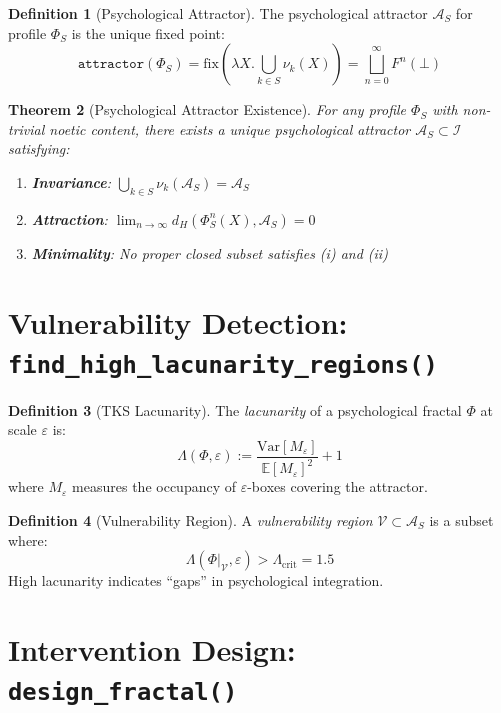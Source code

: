 \documentclass[11pt,twoside]{book}
\newcommand{\noe}[1]{\nu_{#1}}
\newcommand{\Ideas}{\mathcal{I}}
\newcommand{\Frac}{\Phi}
\newcommand{\Lacunarity}{\Lambda}
\newcommand{\fix}{\mathrm{fix}}
\newcommand{\PsychAttractor}{\mathcal{A}}
\newcommand{\ProfileFrac}{\Phi}
\newcommand{\VulnSet}{\mathcal{V}}
\theoremstyle{definition}
\newtheorem{definition}{Definition}[chapter]
\theoremstyle{plain}
\newtheorem{theorem}[definition]{Theorem}
\theoremstyle{remark}
\begin{document}
\begin{definition}[Psychological Attractor]
The psychological attractor $\PsychAttractor_S$ for profile $\ProfileFrac_S$ is the unique fixed point:
\begin{equation}
\boxed{
    \texttt{attractor}(\ProfileFrac_S) = \fix\left(\lambda X. \bigcup_{k \in S} \noe{k}(X)\right)
    = \bigsqcup_{n=0}^{\infty} F^n(\bot)
}
\end{equation}
\end{definition}

\begin{theorem}[Psychological Attractor Existence]
For any profile $\ProfileFrac_S$ with non-trivial noetic content, there exists a unique psychological attractor $\PsychAttractor_S \subset \Ideas$ satisfying:
\begin{enumerate}[label=(\roman*)]
    \item \textbf{Invariance}: $\bigcup_{k \in S} \noe{k}(\PsychAttractor_S) = \PsychAttractor_S$
    \item \textbf{Attraction}: $\lim_{n \to \infty} d_H(\ProfileFrac^n_S(X), \PsychAttractor_S) = 0$
    \item \textbf{Minimality}: No proper closed subset satisfies (i) and (ii)
\end{enumerate}
\end{theorem}

\section{Vulnerability Detection: \texttt{find\_high\_lacunarity\_regions()}}

\begin{definition}[TKS Lacunarity]
The \emph{lacunarity} of a psychological fractal $\Frac$ at scale $\varepsilon$ is:
\[
    \Lacunarity(\Frac, \varepsilon) := \frac{\mathrm{Var}[M_\varepsilon]}{\mathbb{E}[M_\varepsilon]^2} + 1
\]
where $M_\varepsilon$ measures the occupancy of $\varepsilon$-boxes covering the attractor.
\end{definition}

\begin{definition}[Vulnerability Region]
A \emph{vulnerability region} $\VulnSet \subset \PsychAttractor_S$ is a subset where:
\[
    \Lacunarity(\Frac|_{\VulnSet}, \varepsilon) > \Lacunarity_{\mathrm{crit}} = 1.5
\]
High lacunarity indicates ``gaps'' in psychological integration.
\end{definition}

\section{Intervention Design: \texttt{design\_fractal()}}
\end{document}
